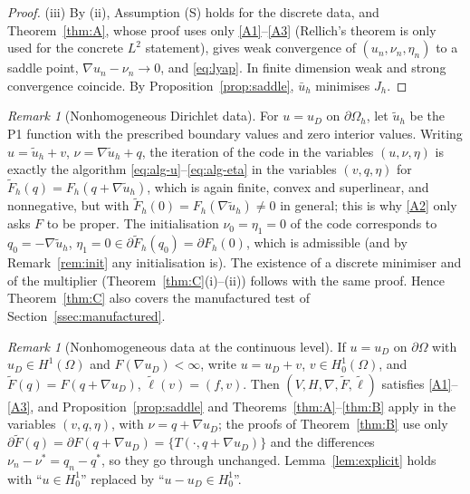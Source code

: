 \documentclass[11pt]{amsart}
\theoremstyle{definition}
\theoremstyle{remark}
\newtheorem{remark}[theorem]{Remark}
\numberwithin{equation}{section}
\begin{document}
\begin{proof}
(iii) By (ii), Assumption (S) holds for the discrete data, and Theorem~\ref{thm:A}, whose proof uses only \ref{A1}--\ref{A3} (Rellich's theorem is only used for the concrete $L^2$ statement), gives weak convergence of $(u_n,\nu_n,\eta_n)$ to a saddle point, $\nabla u_n-\nu_n\to0$, and \eqref{eq:lyap}. In finite dimension weak and strong convergence coincide. By Proposition~\ref{prop:saddle}, $\bar u_h$ minimises $J_h$.
\end{proof}

\begin{remark}[Nonhomogeneous Dirichlet data]\label{rem:dirichlet}
For $u=u_D$ on $\partial\Omega_h$, let $\tilde u_h$ be the P1 function with the prescribed boundary values and zero interior values. Writing $u=\tilde u_h+v$, $\nu=\nabla\tilde u_h+q$, the iteration of the code in the variables $(u,\nu,\eta)$ is exactly the algorithm \eqref{eq:alg-u}--\eqref{eq:alg-eta} in the variables $(v,q,\eta)$ for $\tilde F_h(q)=F_h(q+\nabla\tilde u_h)$, which is again finite, convex and superlinear, and nonnegative, but with $\tilde F_h(0)=F_h(\nabla\tilde u_h)\ne0$ in general; this is why \ref{A2} only asks $F$ to be proper. The initialisation $\nu_0=\eta_1=0$ of the code corresponds to $q_0=-\nabla\tilde u_h$, $\eta_1=0\in\partial\tilde F_h(q_0)=\partial F_h(0)$, which is admissible (and by Remark~\ref{rem:init} any initialisation is). The existence of a discrete minimiser and of the multiplier (Theorem~\ref{thm:C}(i)--(ii)) follows with the same proof. Hence Theorem~\ref{thm:C} also covers the manufactured test of Section~\ref{ssec:manufactured}.
\end{remark}

\begin{remark}[Nonhomogeneous data at the continuous level]\label{rem:dirichlet-cont}
If $u=u_D$ on $\partial\Omega$ with $u_D\in H^1(\Omega)$ and $F(\nabla u_D)<\infty$, write $u=u_D+v$, $v\in H^1_0(\Omega)$, and $\tilde F(q)=F(q+\nabla u_D)$, $\tilde\ell(v)=(f,v)$. Then $(V,H,\nabla,\tilde F,\tilde\ell)$ satisfies \ref{A1}--\ref{A3}, and Proposition~\ref{prop:saddle} and Theorems~\ref{thm:A}--\ref{thm:B} apply in the variables $(v,q,\eta)$, with $\nu=q+\nabla u_D$; the proofs of Theorem~\ref{thm:B} use only $\partial\tilde F(q)=\partial F(q+\nabla u_D)=\{T(\cdot,q+\nabla u_D)\}$ and the differences $\nu_n-\nu^*=q_n-q^*$, so they go through unchanged. Lemma~\ref{lem:explicit} holds with ``$u\in H^1_0$'' replaced by ``$u-u_D\in H^1_0$''.
\end{remark}
\end{document}
